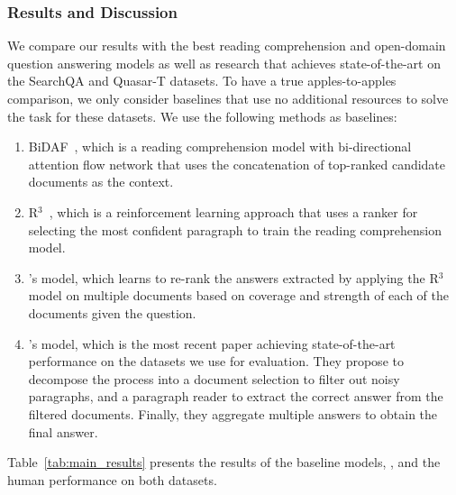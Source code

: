 \subsubsection{Results and Discussion}

We compare our results with the best reading comprehension and open-domain question answering models as well as research that achieves state-of-the-art on the SearchQA and Quasar-T datasets. 
To have a true apples-to-apples comparison, we only consider baselines that use no additional resources to solve the task for these datasets. 
We use the following methods as baselines:
\begin{enumerate}[leftmargin=*]
    \item BiDAF~\citep{seo2016bidirectional}, which is a reading comprehension model with bi-directional attention flow network that uses the concatenation of top-ranked candidate documents as the context.
    \item R$^3$~\citep{wang2017r}, which is a reinforcement learning approach that uses a ranker for selecting the most confident paragraph to train the reading comprehension model.
    \item \citet{wang2017evidence}'s model, which learns to re-rank the answers extracted by applying the R$^3$ model on multiple documents based on coverage and strength of each of the documents given the question.
    \item \citet{lin2018denoising}'s model, which is the most recent paper achieving state-of-the-art performance on the datasets we use for evaluation. 
    They propose to decompose the process into a document selection to filter out noisy paragraphs, and a paragraph reader to extract the correct answer from the filtered documents. 
    Finally, they aggregate multiple answers to obtain the final answer.
\end{enumerate}
%
Table~\ref{tab:main_results} presents the results of the baseline models, \tracrnet, and the human performance on both datasets.


